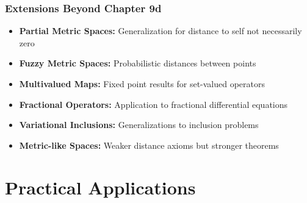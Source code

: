 \documentclass[aspectratio=169,10pt]{beamer}
\begin{document}
\begin{frame}
    \frametitle{Extensions Beyond Chapter 9d}

    \begin{itemize}
        \item \textbf{Partial Metric Spaces:} Generalization for distance to self not necessarily zero

        \item \textbf{Fuzzy Metric Spaces:} Probabilistic distances between points

        \item \textbf{Multivalued Maps:} Fixed point results for set-valued operators

        \item \textbf{Fractional Operators:} Application to fractional differential equations

        \item \textbf{Variational Inclusions:} Generalizations to inclusion problems

        \item \textbf{Metric-like Spaces:} Weaker distance axioms but stronger theorems
    \end{itemize}
\end{frame}

\section{Practical Applications}
\end{document}
